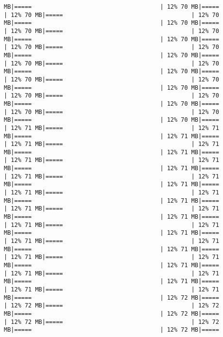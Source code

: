 \documentclass[
]{article}
\begin{document}
\begin{verbatim}
MB|=====                                     | 12% 70 MB|=====                                     | 12% 70 MB|=====                                     | 12% 70 MB|=====                                     | 12% 70 MB|=====                                     | 12% 70 MB|=====                                     | 12% 70 MB|=====                                     | 12% 70 MB|=====                                     | 12% 70 MB|=====                                     | 12% 70 MB|=====                                     | 12% 70 MB|=====                                     | 12% 70 MB|=====                                     | 12% 70 MB|=====                                     | 12% 70 MB|=====                                     | 12% 70 MB|=====                                     | 12% 70 MB|=====                                     | 12% 70 MB|=====                                     | 12% 70 MB|=====                                     | 12% 70 MB|=====                                     | 12% 70 MB|=====                                     | 12% 70 MB|=====                                     | 12% 70 MB|=====                                     | 12% 70 MB|=====                                     | 12% 71 MB|=====                                     | 12% 71 MB|=====                                     | 12% 71 MB|=====                                     | 12% 71 MB|=====                                     | 12% 71 MB|=====                                     | 12% 71 MB|=====                                     | 12% 71 MB|=====                                     | 12% 71 MB|=====                                     | 12% 71 MB|=====                                     | 12% 71 MB|=====                                     | 12% 71 MB|=====                                     | 12% 71 MB|=====                                     | 12% 71 MB|=====                                     | 12% 71 MB|=====                                     | 12% 71 MB|=====                                     | 12% 71 MB|=====                                     | 12% 71 MB|=====                                     | 12% 71 MB|=====                                     | 12% 71 MB|=====                                     | 12% 71 MB|=====                                     | 12% 71 MB|=====                                     | 12% 71 MB|=====                                     | 12% 71 MB|=====                                     | 12% 71 MB|=====                                     | 12% 71 MB|=====                                     | 12% 71 MB|=====                                     | 12% 71 MB|=====                                     | 12% 71 MB|=====                                     | 12% 71 MB|=====                                     | 12% 71 MB|=====                                     | 12% 71 MB|=====                                     | 12% 71 MB|=====                                     | 12% 72 MB|=====                                     | 12% 72 MB|=====                                     | 12% 72 MB|=====                                     | 12% 72 MB|=====                                     | 12% 72 MB|=====                                     | 12% 72 MB|=====                                     | 12% 72 MB|=====                 
\end{verbatim}
\end{document}
